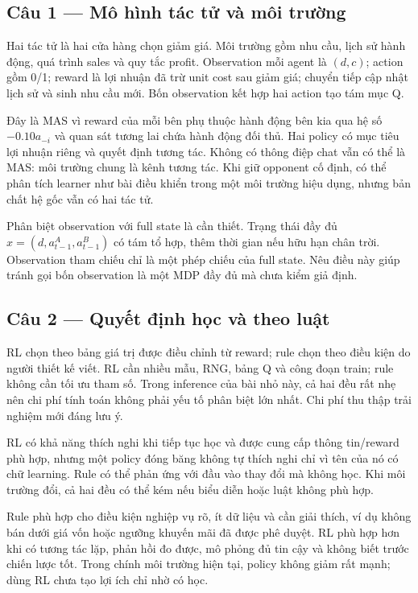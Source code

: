 \subsection{Câu 1 --- Mô hình tác tử và môi
trường}\label{cuxe2u-1-muxf4-huxecnh-tuxe1c-tux1eed-vuxe0-muxf4i-trux1b0ux1eddng}

Hai tác tử là hai cửa hàng chọn giảm giá. Môi trường gồm nhu cầu, lịch
sử hành động, quá trình sales và quy tắc profit. Observation mỗi agent
là \((d,c)\); action gồm 0/1; reward là lợi nhuận đã trừ unit cost sau
giảm giá; chuyển tiếp cập nhật lịch sử và sinh nhu cầu mới. Bốn
observation kết hợp hai action tạo tám mục Q.

Đây là MAS vì reward của mỗi bên phụ thuộc hành động bên kia qua hệ số
\(-0.10a_{-i}\) và quan sát tương lai chứa hành động đối thủ. Hai policy
có mục tiêu lợi nhuận riêng và quyết định tương tác. Không có thông điệp
chat vẫn có thể là MAS: môi trường chung là kênh tương tác. Khi giữ
opponent cố định, có thể phân tích learner như bài điều khiển trong một
môi trường hiệu dụng, nhưng bản chất hệ gốc vẫn có hai tác tử.

Phân biệt observation với full state là cần thiết. Trạng thái đầy đủ
\(x=(d,a_{t-1}^A,a_{t-1}^B)\) có tám tổ hợp, thêm thời gian nếu hữu hạn
chân trời. Observation tham chiếu chỉ là một phép chiếu của full state.
Nêu điều này giúp tránh gọi bốn observation là một MDP đầy đủ mà chưa
kiểm giả định.

\subsection{Câu 2 --- Quyết định học và theo
luật}\label{cuxe2u-2-quyux1ebft-ux111ux1ecbnh-hux1ecdc-vuxe0-theo-luux1eadt}

RL chọn theo bảng giá trị được điều chỉnh từ reward; rule chọn theo điều
kiện do người thiết kế viết. RL cần nhiều mẫu, RNG, bảng Q và công đoạn
train; rule không cần tối ưu tham số. Trong inference của bài nhỏ này,
cả hai đều rất nhẹ nên chi phí tính toán không phải yếu tố phân biệt lớn
nhất. Chi phí thu thập trải nghiệm mới đáng lưu ý.

RL có khả năng thích nghi khi tiếp tục học và được cung cấp thông
tin/reward phù hợp, nhưng một policy đóng băng không tự thích nghi chỉ
vì tên của nó có chữ learning. Rule có thể phản ứng với đầu vào thay đổi
mà không học. Khi môi trường đổi, cả hai đều có thể kém nếu biểu diễn
hoặc luật không phù hợp.

Rule phù hợp cho điều kiện nghiệp vụ rõ, ít dữ liệu và cần giải thích,
ví dụ không bán dưới giá vốn hoặc ngưỡng khuyến mãi đã được phê duyệt.
RL phù hợp hơn khi có tương tác lặp, phản hồi đo được, mô phỏng đủ tin
cậy và không biết trước chiến lược tốt. Trong chính môi trường hiện tại,
policy không giảm rất mạnh; dùng RL chưa tạo lợi ích chỉ nhờ có học.

